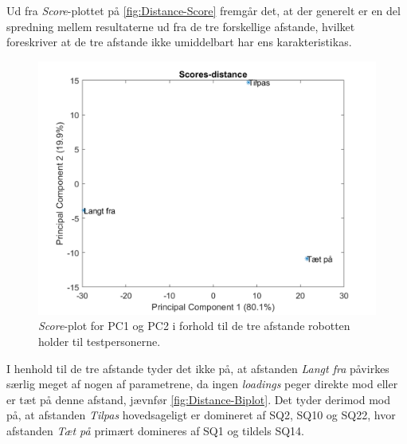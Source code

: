 \noindent
%
Ud fra \textit{Score}-plottet på \autoref{fig:Distance-Score} fremgår det, at der generelt er en del spredning mellem resultaterne ud fra de tre forskellige afstande, hvilket foreskriver at de tre afstande ikke umiddelbart har ens karakteristikas.
%
\begin{figure}[H]
\centering
\includegraphics[width=\textwidth]{Figure/DatabehandlingSkalaer/PCAfigures/Distance-Scores}
\caption{\textit{Score}-plot for PC1 og PC2 i forhold til de tre afstande robotten holder til testpersonerne.}
\label{fig:Distance-Score}
\end{figure}
\noindent
%
I henhold til de tre afstande tyder det ikke på, at afstanden \textit{Langt fra} påvirkes særlig meget af nogen af parametrene, da ingen \textit{loadings} peger direkte mod eller er tæt på denne afstand, jævnfør \autoref{fig:Distance-Biplot}. Det tyder derimod mod på, at afstanden \textit{Tilpas} hovedsageligt er domineret af SQ2, SQ10 og SQ22, hvor afstanden \textit{Tæt på} primært domineres af SQ1 og tildels SQ14.     

